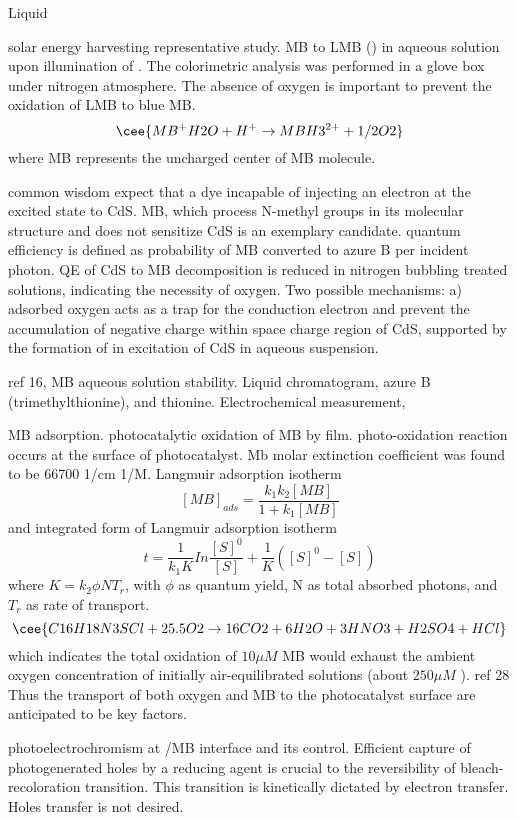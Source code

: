 Liquid

solar energy harvesting representative study.\cite{Yoneyama1972} MB to LMB () in aqueous solution upon illumination of . The colorimetric analysis was performed in a glove box under nitrogen atmosphere. The absence of oxygen is important to prevent the oxidation of LMB to blue MB.
\[
\cee{MB^+ H2O + H^+ \rightarrow MBH3^{2+} + 1/2O2}
\]
where MB represents the uncharged center of MB molecule.

\cite{Takizawa1978} common wisdom expect that a dye incapable of injecting an electron at the excited state to CdS. MB, which process N-methyl groups in its molecular structure and does not sensitize CdS is an exemplary candidate. quantum efficiency is defined as probability of MB converted to azure B per incident photon. QE of CdS to MB decomposition is reduced in nitrogen bubbling treated solutions, indicating the necessity of oxygen. Two possible mechanisms: a) adsorbed oxygen acts as a trap for the conduction electron and prevent the accumulation of negative charge within space charge region of CdS, supported by the formation of  in excitation of CdS in aqueous suspension.

ref 16, MB aqueous solution stability. Liquid chromatogram, azure B (trimethylthionine), and thionine. Electrochemical measurement,

\cite{Matthews1989} MB adsorption.  photocatalytic oxidation of MB by  film. photo-oxidation reaction occurs at the surface of photocatalyst. Mb molar extinction coefficient was found to be 66700 1/cm 1/M. Langmuir adsorption isotherm
\[
[MB]_{ads} = \frac{k_1 k_2 [MB]}{1 + k_1[MB]}
\]
and integrated form of Langmuir adsorption isotherm
\[
t = \frac{1}{k_1K} In\frac{[S]^0}{[S]} + \frac{1}{K}([S]^0 - [S])
\]
where $K = k_2 \phi N T_r$, with $\phi$ as quantum yield, N as total absorbed photons, and $T_r$ as rate of transport.
\[
\cee{C16H18N3SCl + 25.5O2 \rightarrow 16CO2 + 6H2O + 3HNO3 + H2SO4 +HCl}
\]
which indicates the total oxidation of $10 \mu M$ MB would exhaust the ambient oxygen concentration of initially air-equilibrated solutions (about $250 \mu M$ ). ref 28 Thus the transport of both oxygen and MB to the photocatalyst surface are anticipated to be key factors.

\cite{DeTacconi1997} photoelectrochromism at /MB interface and its control. Efficient capture of photogenerated holes by a reducing agent is crucial to the reversibility of bleach-recoloration transition. This transition is kinetically dictated by electron transfer. Holes transfer is not desired.


